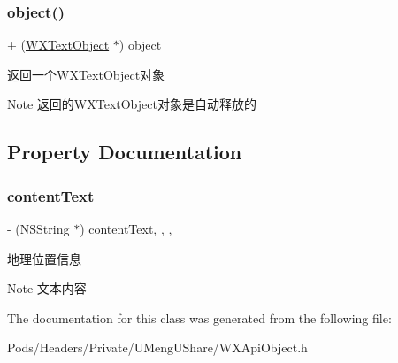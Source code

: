 \subsubsection{\texorpdfstring{object()}{object()}\hspace{0.1cm}{\footnotesize\ttfamily [3/3]}}
{\footnotesize\ttfamily + (\mbox{\hyperlink{interface_w_x_text_object}{W\+X\+Text\+Object}} $\ast$) object \begin{DoxyParamCaption}{ }\end{DoxyParamCaption}}



返回一个\+W\+X\+Text\+Object对象 

\begin{DoxyNote}{Note}
返回的\+W\+X\+Text\+Object对象是自动释放的 
\end{DoxyNote}


\subsection{Property Documentation}
\mbox{\label{interface_w_x_text_object_a2311fbb34b7c0d2520349469b162e28f}} 
\subsubsection{\texorpdfstring{content\+Text}{contentText}}
{\footnotesize\ttfamily -\/ (N\+S\+String $\ast$) content\+Text\hspace{0.3cm}{\ttfamily [read]}, {\ttfamily [write]}, {\ttfamily [nonatomic]}, {\ttfamily [retain]}}

地理位置信息 \begin{DoxyNote}{Note}
文本内容 
\end{DoxyNote}


The documentation for this class was generated from the following file\+:\begin{DoxyCompactItemize}
\item 
Pods/\+Headers/\+Private/\+U\+Meng\+U\+Share/W\+X\+Api\+Object.\+h\end{DoxyCompactItemize}
